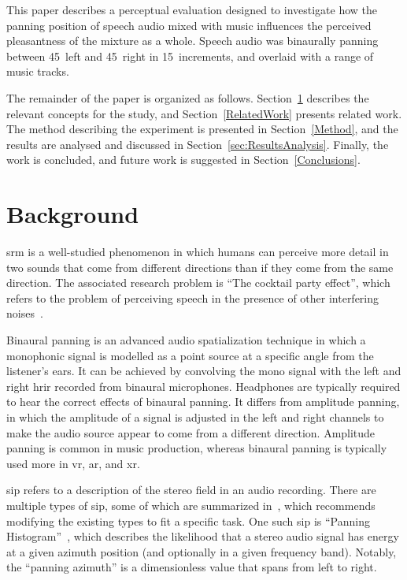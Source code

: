 \documentclass[a4paper,10pt]{edpsci} %
\begin{document}
This paper describes a perceptual evaluation designed to investigate how the panning position of speech audio mixed with music influences the perceived pleasantness of the mixture as a whole. Speech audio was binaurally panning between 45\textdegree~left and 45\textdegree~right in 15\textdegree~increments, and overlaid with a range of music tracks.

The remainder of the paper is organized as follows. Section~\ref{Background} describes the relevant concepts for the study, and Section~\ref{RelatedWork} presents related work. The method describing the experiment is presented in Section~\ref{Method}, and the results are analysed and discussed in Section~\ref{sec:ResultsAnalysis}. Finally, the work is concluded, and future work is suggested in Section~\ref{Conclusions}.

\section{Background}\label{Background}
\gls{srm} is a well-studied phenomenon in which humans can perceive more detail in two sounds that come from different directions than if they come from the same direction. The associated research problem is \enquote{The cocktail party effect}, which refers to the problem of perceiving speech in the presence of other interfering noises~\cite{litovsky_spatial_2012}.

Binaural panning is an advanced audio spatialization technique in which a monophonic signal is modelled as a point source at a specific angle from the listener's ears. It can be achieved by convolving the mono signal with the left and right \gls{hrir} recorded from binaural microphones. Headphones are typically required to hear the correct effects of binaural panning. It differs from amplitude panning, in which the amplitude of a signal is adjusted in the left and right channels to make the audio source appear to come from a different direction. Amplitude panning is common in music production, whereas binaural panning is typically used more in \gls{vr}, \gls{ar}, and \gls{xr}.

\gls{sip} refers to a description of the stereo field in an audio recording. There are multiple types of \gls{sip}, some of which are summarized in~\cite{mitic_towards_2025}, which recommends modifying the existing types to fit a specific task. One such \gls{sip} is \enquote{Panning Histogram}~\cite{gomez_music_2008}, which describes the likelihood that a stereo audio signal has energy at a given azimuth position (and optionally in a given frequency band). Notably, the \enquote{panning azimuth} is a dimensionless value that spans from left to right.
\end{document}
